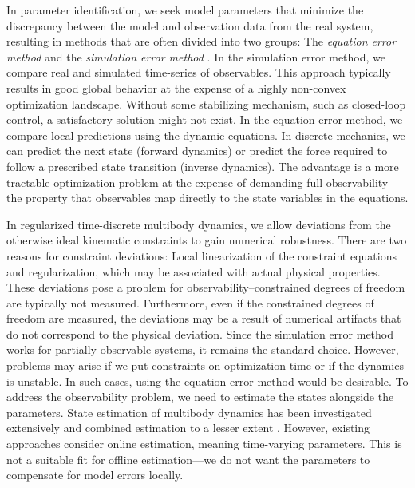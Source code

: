 \documentclass[preprint,12pt]{elsarticle}
\numberwithin{equation}{section}
\begin{document}
In parameter identification, we seek model parameters that minimize the discrepancy between the model and observation data from the real system, resulting in methods that are often divided into two groups: The \textit{equation error method} and the \textit{simulation error method} \cite{lee2023robot}.
In the simulation error method, we compare real and simulated time-series of observables.
This approach typically results in good global behavior at the expense of a highly non-convex optimization landscape.
Without some stabilizing mechanism, such as closed-loop control, a satisfactory solution might not exist.
In the equation error method, we compare local predictions using the dynamic equations.
In discrete mechanics, we can predict the next state (forward dynamics) or predict the force required to follow a prescribed state transition (inverse dynamics).
The advantage is a more tractable optimization problem at the expense of demanding full observability---the property that observables map directly to the state variables in the equations.

In regularized time-discrete multibody dynamics, we allow deviations from the otherwise ideal kinematic constraints to gain numerical robustness.
There are two reasons for constraint deviations:
Local linearization of the constraint equations and regularization, which may be associated with actual physical properties.
These deviations pose a problem for observability--constrained degrees of freedom are typically not measured.
Furthermore, even if the constrained degrees of freedom are measured, the deviations may be a result of numerical artifacts that do not correspond to the physical deviation.
Since the simulation error method works for partially observable systems, it remains the standard choice.
However, problems may arise if we put constraints on optimization time or if the dynamics is unstable.
In such cases, using the equation error method would be desirable.
To address the observability problem, we need to estimate the states alongside the parameters.
State estimation of multibody dynamics has been investigated extensively \cite{nayaKalmanFiltersBased2023,pastorino2013state, sanjurjoAccuracyEfficiencyComparison2017} and combined estimation to a lesser extent \cite{nayaKalmanFiltersBased2023, blanchardPolynomialChaosBasedKalman2010}.
However, existing approaches consider online estimation, meaning time-varying parameters. This is not a suitable fit for offline estimation---we do not want the parameters to compensate for model errors locally.
\end{document}
